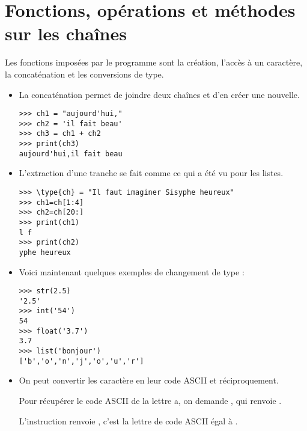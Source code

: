 \section{Fonctions, opérations et méthodes sur les chaînes}
Les fonctions imposées par le programme sont la création, l'accès à un caractère, la concaténation et les conversions de type.
\begin{itemize}
  \item La concaténation permet de joindre deux chaînes et d'en créer une nouvelle.
\begin{lstlisting}
>>> ch1 = "aujourd'hui,"
>>> ch2 = 'il fait beau'
>>> ch3 = ch1 + ch2
>>> print(ch3)
aujourd'hui,il fait beau
\end{lstlisting}
  \item L'extraction d'une tranche se fait comme ce qui a été vu pour les listes.
\begin{lstlisting}
>>> \type{ch} = "Il faut imaginer Sisyphe heureux"
>>> ch1=ch[1:4]
>>> ch2=ch[20:]
>>> print(ch1)
l f
>>> print(ch2)
yphe heureux
\end{lstlisting}
  \item Voici maintenant quelques exemples de changement de type :
\begin{lstlisting}
>>> str(2.5)
'2.5'
>>> int('54')
54
>>> float('3.7')
3.7
>>> list('bonjour')
['b','o','n','j','o','u','r']
\end{lstlisting}
  \item On peut convertir les caractère en leur code ASCII et réciproquement.
  
  Pour récupérer le code ASCII de la lettre a, on demande , qui renvoie . 
  
  L'instruction  renvoie , c'est la lettre de code ASCII égal à .
\end{itemize}


